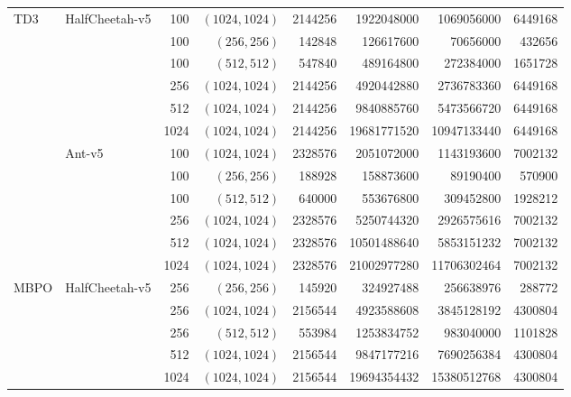 {\begin{longtable}{@{}llrrrrrr@{}}
      \midrule
      TD3 & HalfCheetah-v5 & \num{100} & $(1024,1024)$ & \num{2144256} & \num{1922048000} & \num{1069056000} & \num{6449168} \\
       &  & \num{100} & $(256,256)$ & \num{142848} & \num{126617600} & \num{70656000} & \num{432656} \\
       &  & \num{100} & $(512,512)$ & \num{547840} & \num{489164800} & \num{272384000} & \num{1651728} \\
       &  & \num{256} & $(1024,1024)$ & \num{2144256} & \num{4920442880} & \num{2736783360} & \num{6449168} \\
       &  & \num{512} & $(1024,1024)$ & \num{2144256} & \num{9840885760} & \num{5473566720} & \num{6449168} \\
       &  & \num{1024} & $(1024,1024)$ & \num{2144256} & \num{19681771520} & \num{10947133440} & \num{6449168} \\
       & Ant-v5 & \num{100} & $(1024,1024)$ & \num{2328576} & \num{2051072000} & \num{1143193600} & \num{7002132} \\
       &  & \num{100} & $(256,256)$ & \num{188928} & \num{158873600} & \num{89190400} & \num{570900} \\
       &  & \num{100} & $(512,512)$ & \num{640000} & \num{553676800} & \num{309452800} & \num{1928212} \\
       &  & \num{256} & $(1024,1024)$ & \num{2328576} & \num{5250744320} & \num{2926575616} & \num{7002132} \\
       &  & \num{512} & $(1024,1024)$ & \num{2328576} & \num{10501488640} & \num{5853151232} & \num{7002132} \\
       &  & \num{1024} & $(1024,1024)$ & \num{2328576} & \num{21002977280} & \num{11706302464} & \num{7002132} \\
      \midrule
      MBPO & HalfCheetah-v5 & \num{256} & $(256,256)$ & \num{145920} & \num{324927488} & \num{256638976} & \num{288772} \\
       &  & \num{256} & $(1024,1024)$ & \num{2156544} & \num{4923588608} & \num{3845128192} & \num{4300804} \\
       &  & \num{256} & $(512,512)$ & \num{553984} & \num{1253834752} & \num{983040000} & \num{1101828} \\
       &  & \num{512} & $(1024,1024)$ & \num{2156544} & \num{9847177216} & \num{7690256384} & \num{4300804} \\
       &  & \num{1024} & $(1024,1024)$ & \num{2156544} & \num{19694354432} & \num{15380512768} & \num{4300804} \\

\end{longtable}}
